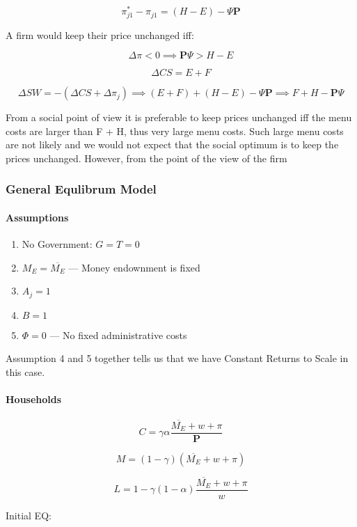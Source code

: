 $$
\pi^*_{j1} - \pi_{j1} = (H - E) - \Psi \mathbf{P}
$$

A firm would keep their price unchanged iff:

$$
\Delta \pi < 0 \implies \mathbf{P} \Psi > H- E
$$

$$
\Delta CS  = E + F
$$

$$
\Delta SW = - \left(  \Delta CS + \Delta \pi_j  \right) \implies (E + F) + (H - E) - \Psi \mathbf{P} \implies F + H - \mathbf{P} \Psi
$$

From a social point of view it is preferable to keep prices unchanged iff the menu costs are larger than F + H, thus very large menu costs. Such large menu costs are not likely and we would not expect that the social optimum is to keep the prices unchanged. However, from the point of the view of the firm  

\subsubsection{General Equlibrum Model}

\paragraph{Assumptions}
\begin{enumerate}
    \item No Government: $G = T = 0$
    \item $M_E = \overline{M_E}$ --- Money endownment is fixed
    \item $A_j = 1$
    \item $B = 1$
    \item $\Phi = 0$ --- No fixed administrative costs
\end{enumerate}

Assumption 4 and 5 together tells us that we have Constant Returns to Scale in this case. 

\paragraph{Households}

$$
C = \gamma \alpha \frac { \overline { M _ { E } } + w + \pi } { \mathbf { P } }
$$

$$
M= ( 1 - \gamma) \left( \overline { M _ { E } } + w + \pi \right)
$$

$$
L = 1 - \gamma \left( 1 - \alpha  \right) \frac{\overline{M_E} + w + \pi}{w}
$$

Initial EQ:

